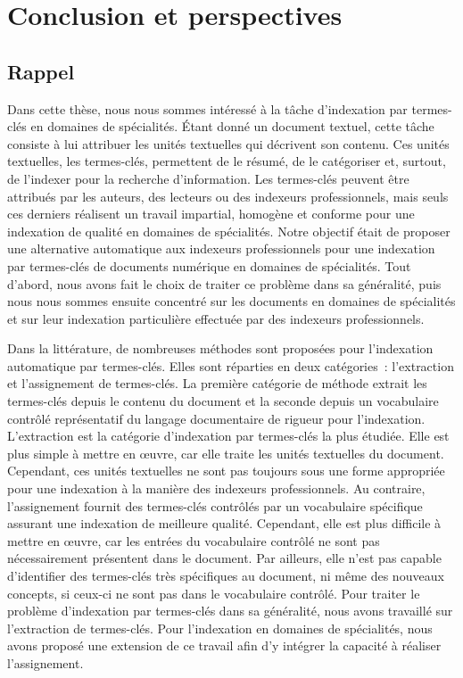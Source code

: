 \chapter{Conclusion et perspectives}
\label{chap:main-conclusion}

  \section{Rappel}
  \label{sec:main-conclusion-rappel}
    Dans cette thèse, nous nous sommes intéressé à la tâche d'indexation par
    termes-clés en domaines de spécialités. Étant donné un document textuel,
    cette tâche consiste à lui attribuer les unités textuelles qui décrivent son
    contenu. Ces unités textuelles, les termes-clés, permettent de le résumé, de
    le catégoriser et, surtout, de l'indexer pour la recherche d'information.
    Les termes-clés peuvent être attribués par les auteurs, des lecteurs ou des
    indexeurs professionnels, mais seuls ces derniers réalisent un travail
    impartial, homogène et conforme pour une indexation de qualité en domaines
    de spécialités. Notre objectif était de proposer une alternative automatique
    aux indexeurs professionnels pour une indexation par termes-clés de
    documents numérique en domaines de spécialités. Tout d'abord, nous avons
    fait le choix de traiter ce problème dans sa généralité, puis nous nous
    sommes ensuite concentré sur les documents en domaines de spécialités et sur
    leur indexation particulière effectuée par des indexeurs professionnels.

    Dans la littérature, de nombreuses méthodes sont proposées pour l'indexation
    automatique par termes-clés. Elles sont réparties en deux catégories~:
    l'extraction et l'assignement de termes-clés. La première catégorie de
    méthode extrait les termes-clés depuis le contenu du document et la seconde
    depuis un vocabulaire contrôlé représentatif du langage documentaire de
    rigueur pour l'indexation. L'extraction est la catégorie d'indexation par
    termes-clés la plus étudiée. Elle est plus simple à mettre en \oe{}uvre, car
    elle traite les unités textuelles du document. Cependant, ces unités
    textuelles ne sont pas toujours sous une forme appropriée pour une
    indexation à la manière des indexeurs professionnels. Au contraire,
    l'assignement fournit des termes-clés contrôlés par un vocabulaire
    spécifique assurant une indexation de meilleure qualité. Cependant, elle est
    plus difficile à mettre en \oe{}uvre, car les entrées du vocabulaire
    contrôlé ne sont pas nécessairement présentent dans le document. Par
    ailleurs, elle n'est pas capable d'identifier des termes-clés très
    spécifiques au document, ni même des nouveaux concepts, si ceux-ci ne sont
    pas dans le vocabulaire contrôlé. Pour traiter le problème d'indexation par
    termes-clés dans sa généralité, nous avons travaillé sur l'extraction de
    termes-clés. Pour l'indexation en domaines de spécialités, nous avons
    proposé une extension de ce travail afin d'y intégrer la capacité à réaliser
    l'assignement.

